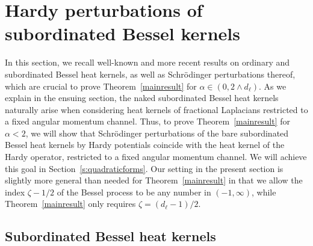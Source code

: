 \documentclass[12pt,reqno]{amsart}
\theoremstyle{definition}
\theoremstyle{remark}
\numberwithin{equation}{section}
\newcommand{\1}{\mathbbm{1}}
\begin{document}
\section{Hardy perturbations of subordinated Bessel kernels}
\label{s:pointwise}

In this section, we recall well-known and more recent results on ordinary and subordinated Bessel heat kernels, as well as Schr\"odinger perturbations thereof, which are crucial to prove Theorem~\ref{mainresult} for $\alpha\in(0,2\wedge d_\ell)$. As we explain in the ensuing section, the naked subordinated Bessel heat kernels naturally arise when considering heat kernels of fractional Laplacians restricted to a fixed angular momentum channel. Thus, to prove Theorem~\ref{mainresult} for $\alpha<2$, we will show that Schr\"odinger perturbations of the bare subordinated Bessel heat kernels by Hardy potentials coincide with the heat kernel of the Hardy operator, restricted to a fixed angular momentum channel. We will achieve this goal in Section~\ref{s:quadraticforms}.
%
Our setting in the present section is slightly more general than needed for Theorem~\ref{mainresult} in that we allow the index $\zeta-1/2$ of the Bessel process to be any number in $(-1,\infty)$, while Theorem~\ref{mainresult} only requires $\zeta=(d_\ell-1)/2$.


\subsection{Subordinated Bessel heat kernels}
\label{s:semigroupproperties}
\end{document}
